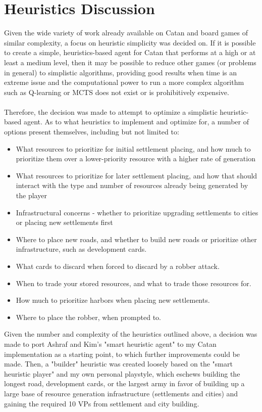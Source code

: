 \documentclass[a4paper, 11pt]{article}
\begin{document}
\section{Heuristics Discussion}
Given the wide variety of work already available on Catan and board games of similar complexity, a focus on heuristic simplicity was decided on. If it is possible to create a simple, heuristics-based agent for Catan that performs at a high or at least a medium level, then it may be possible to reduce other games (or problems in general) to simplistic algorithms, providing good results when time is an extreme issue and the computational power to run a more complex algorithm such as Q-learning or MCTS does not exist or is prohibitively expensive.
\\ \\
\noindent Therefore, the decision was made to attempt to optimize a simplistic heuristic-based agent. As to what heuristics to implement and optimize for, a number of options present themselves, including but not limited to:
\begin{itemize}
	\item What resources to prioritize for initial settlement placing, and how much to prioritize them over a lower-priority resource with a higher rate of generation
	\item What resources to prioritize for later settlement placing, and how that should interact with the type and number of resources already being generated by the player
	\item Infrastructural concerns - whether to prioritize upgrading settlements to cities or placing new settlements first
	\item Where to place new roads, and whether to build new roads or prioritize other infrastructure, such as development cards.
	\item What cards to discard when forced to discard by a robber attack.
	\item When to trade your stored resources, and what to trade those resources for.
	\item How much to prioritize harbors when placing new settlements.
	\item Where to place the robber, when prompted to.
\end{itemize}
\noindent Given the number and complexity of the heuristics outlined above, a decision was made to port Ashraf and Kim's "smart heuristic agent" to my Catan implementation as a starting point, to which further improvements could be made. Then, a "builder" heuristic was created loosely based on the "smart heuristic player" and my own personal playstyle, which eschews building the longest road, development cards, or the largest army in favor of building up a large base of resource generation infrastructure (settlements and cities) and gaining the required 10 VPs from settlement and city building. 
\end{document}
